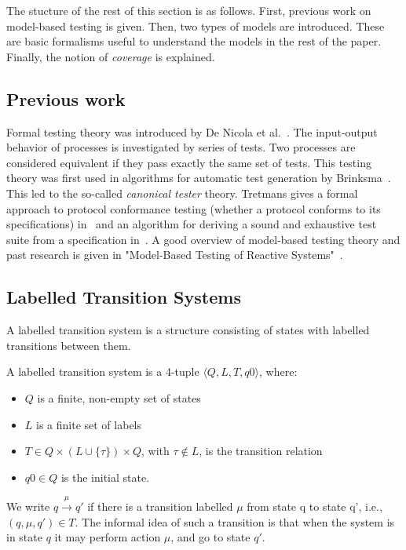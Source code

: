 The stucture of the rest of this section is as follows. First, previous work on model-based testing is given. Then, two types of models are introduced. These are basic formalisms useful to understand the models in the rest of the paper. Finally, the notion of \textit{coverage} is explained.

\subsection{Previous work}
Formal testing theory was introduced by De Nicola et al.~\cite{denicola:testing}. The input-output behavior of processes is investigated by series of tests. Two processes are considered equivalent if they pass exactly the same set of tests. This testing theory was first used in algorithms for automatic test generation by Brinksma~\cite{brinksma:testgeneration}. This led to the so-called \textit{canonical tester} theory. Tretmans gives a formal approach to protocol conformance testing (whether a protocol conforms to its specifications) in~\cite{Tretmans:conformancetesting} and an algorithm for deriving a sound and exhaustive test suite from a specification in~\cite{Tretmans:testgeneration}. A good overview of model-based testing theory and past research is given in "Model-Based Testing of Reactive Systems"~\cite{Broy:ModelBasedTesting}.

\subsection{Labelled Transition Systems}
A labelled transition system is a structure consisting of states with labelled transitions between them.
\vspace{5px}
\begin{definition}
A labelled transition system is a 4-tuple	$\langle Q, L, T, q0\rangle$, where:
\begin{itemize}
\item $Q$ is a finite, non-empty set of states
\item $L$ is a finite set of labels
\item $T \in Q \times (L \cup \{\tau\}) \times Q$, with $\tau \notin L$, is the transition relation
\item $q0 \in Q$ is the initial state.
\end{itemize}
We write $q \xrightarrow{\mu}q'$ if there is a transition labelled $\mu$ from state q to state q', i.e., $(q, \mu, q') \in T$. The informal idea of such a transition is that when the system is in state $q$ it may perform action $\mu$, and go to state $q'$. 
\end{definition}

